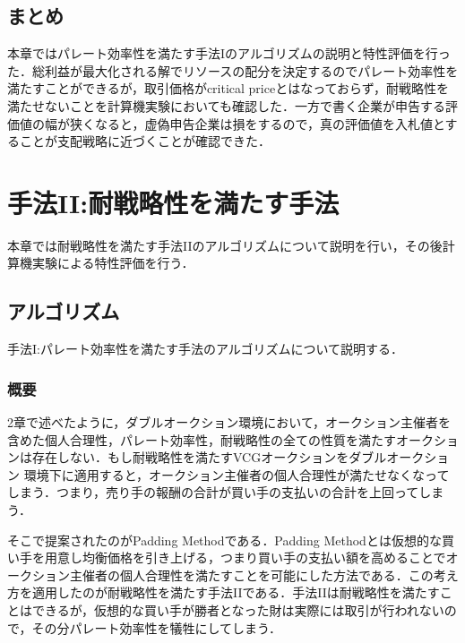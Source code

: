 \hypertarget{ux307eux3068ux3081}{%
\section{まとめ}\label{ux307eux3068ux3081}}

本章ではパレート効率性を満たす手法Iのアルゴリズムの説明と特性評価を行った．総利益が最大化される解でリソースの配分を決定するのでパレート効率性を満たすことができるが，取引価格がcritical
priceとはなっておらず，耐戦略性を満たせないことを計算機実験においても確認した．一方で書く企業が申告する評価値の幅が狭くなると，虚偽申告企業は損をするので，真の評価値を入札値とすることが支配戦略に近づくことが確認できた．

\hypertarget{ux624bux6cd5iiux8010ux6226ux7565ux6027ux3092ux6e80ux305fux3059ux624bux6cd5}{%
\chapter{手法II:耐戦略性を満たす手法}\label{ux624bux6cd5iiux8010ux6226ux7565ux6027ux3092ux6e80ux305fux3059ux624bux6cd5}}

本章では耐戦略性を満たす手法IIのアルゴリズムについて説明を行い，その後計算機実験による特性評価を行う．

\hypertarget{ux30a2ux30ebux30b4ux30eaux30baux30e0-1}{%
\section{アルゴリズム}\label{ux30a2ux30ebux30b4ux30eaux30baux30e0-1}}

手法I:パレート効率性を満たす手法のアルゴリズムについて説明する．

\hypertarget{ux6982ux8981-1}{%
\subsection{概要}\label{ux6982ux8981-1}}

2章で述べたように，ダブルオークション環境において，オークション主催者を含めた個人合理性，パレート効率性，耐戦略性の全ての性質を満たすオークションは存在しない．もし耐戦略性を満たすVCGオークションをダブルオークション
環境下に適用すると，オークション主催者の個人合理性が満たせなくなってしまう．つまり，売り手の報酬の合計が買い手の支払いの合計を上回ってしまう．

そこで提案されたのがPadding Methodである\cite{Chu2009}．Padding
Methodとは仮想的な買い手を用意し均衡価格を引き上げる，つまり買い手の支払い額を高めることでオークション主催者の個人合理性を満たすことを可能にした方法である．この考え方を適用したのが耐戦略性を満たす手法IIである．手法IIは耐戦略性を満たすことはできるが，仮想的な買い手が勝者となった財は実際には取引が行われないので，その分パレート効率性を犠牲にしてしまう．

